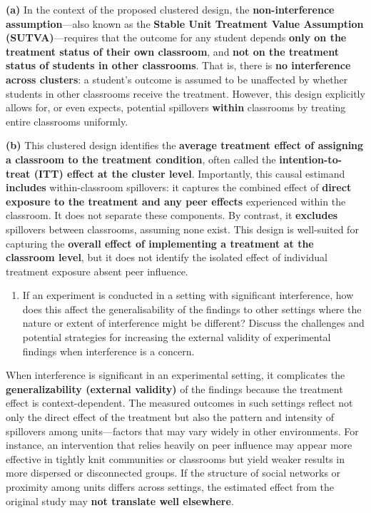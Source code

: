 \documentclass[
  letterpaper,
  DIV=11,
  numbers=noendperiod]{scrartcl}
\providecommand{\tightlist}{%
  \setlength{\itemsep}{0pt}\setlength{\parskip}{0pt}}\usepackage{longtable,booktabs,array}
\begin{document}
\textbf{(a)} In the context of the proposed clustered design, the
\textbf{non-interference assumption}---also known as the \textbf{Stable
Unit Treatment Value Assumption (SUTVA)}---requires that the outcome for
any student depends \textbf{only on the treatment status of their own
classroom}, and \textbf{not on the treatment status of students in other
classrooms}. That is, there is \textbf{no interference across clusters}:
a student's outcome is assumed to be unaffected by whether students in
other classrooms receive the treatment. However, this design explicitly
allows for, or even expects, potential spillovers \textbf{within}
classrooms by treating entire classrooms uniformly.

\textbf{(b)} This clustered design identifies the \textbf{average
treatment effect of assigning a classroom to the treatment condition},
often called the \textbf{intention-to-treat (ITT) effect at the cluster
level}. Importantly, this causal estimand \textbf{includes}
within-classroom spillovers: it captures the combined effect of
\textbf{direct exposure to the treatment and any peer effects}
experienced within the classroom. It does not separate these components.
By contrast, it \textbf{excludes} spillovers between classrooms,
assuming none exist. This design is well-suited for capturing the
\textbf{overall effect of implementing a treatment at the classroom
level}, but it does not identify the isolated effect of individual
treatment exposure absent peer influence.

\begin{enumerate}
\def\labelenumi{\arabic{enumi}.}
\setcounter{enumi}{9}
\tightlist
\item
  If an experiment is conducted in a setting with significant
  interference, how does this affect the generalisability of the
  findings to other settings where the nature or extent of interference
  might be different? Discuss the challenges and potential strategies
  for increasing the external validity of experimental findings when
  interference is a concern.
\end{enumerate}

When interference is significant in an experimental setting, it
complicates the \textbf{generalizability (external validity)} of the
findings because the treatment effect is context-dependent. The measured
outcomes in such settings reflect not only the direct effect of the
treatment but also the pattern and intensity of spillovers among
units---factors that may vary widely in other environments. For
instance, an intervention that relies heavily on peer influence may
appear more effective in tightly knit communities or classrooms but
yield weaker results in more dispersed or disconnected groups. If the
structure of social networks or proximity among units differs across
settings, the estimated effect from the original study may \textbf{not
translate well elsewhere}.
\end{document}
